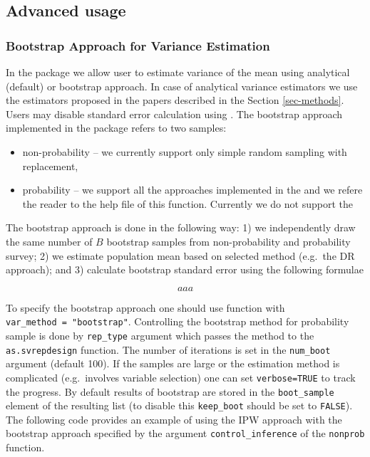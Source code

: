 \documentclass[
]{jss}
\begin{document}
\subsection{Advanced usage}\label{advanced-usage}

\subsubsection{Bootstrap Approach for Variance
Estimation}\label{bootstrap-approach-for-variance-estimation}

In the package we allow user to estimate variance of the mean using
analytical (default) or bootstrap approach. In case of analytical
variance estimators we use the estimators proposed in the papers
described in the Section \ref{sec-methods}. Users may disable standard
error calculation using . The bootstrap approach
implemented in the package refers to two samples:

\begin{itemize}
\item non-probability -- we currently support only simple random sampling with replacement,
\item probability -- we support all the approaches implemented in the  and we refere the reader to the help file of this function. Currently we do not support the 
\end{itemize}

The bootstrap approach is done in the following way: 1) we independently
draw the same number of \(B\) bootstrap samples from non-probability and
probability survey; 2) we estimate population mean based on selected
method (e.g.~the DR approach); and 3) calculate bootstrap standard error
using the following formulae

\begin{equation}
aaa
\end{equation}

To specify the bootstrap approach one should use 
function with \texttt{var\_method\ =\ "bootstrap"}. Controlling the
bootstrap method for probability sample is done by \texttt{rep\_type}
argument which passes the method to the \texttt{as.svrepdesign}
function. The number of iterations is set in the \texttt{num\_boot}
argument (default 100). If the samples are large or the estimation
method is complicated (e.g.~involves variable selection) one can set
\texttt{verbose=TRUE} to track the progress. By default results of
bootstrap are stored in the \texttt{boot\_sample} element of the
resulting list (to disable this \texttt{keep\_boot} should be set to
\texttt{FALSE}). The following code provides an example of using the IPW
approach with the bootstrap approach specified by the argument
\texttt{control\_inference} of the \texttt{nonprob} function.
\end{document}
